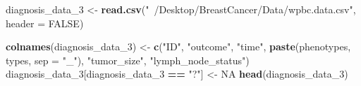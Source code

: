 \documentclass[]{article}
\newenvironment{Shaded}{\begin{snugshade}}{\end{snugshade}}
\newcommand{\KeywordTok}[1]{\textcolor[rgb]{0.13,0.29,0.53}{\textbf{#1}}}
\newcommand{\DataTypeTok}[1]{\textcolor[rgb]{0.13,0.29,0.53}{#1}}
\newcommand{\DecValTok}[1]{\textcolor[rgb]{0.00,0.00,0.81}{#1}}
\newcommand{\StringTok}[1]{\textcolor[rgb]{0.31,0.60,0.02}{#1}}
\newcommand{\OtherTok}[1]{\textcolor[rgb]{0.56,0.35,0.01}{#1}}
\newcommand{\OperatorTok}[1]{\textcolor[rgb]{0.81,0.36,0.00}{\textbf{#1}}}
\newcommand{\NormalTok}[1]{#1}
\begin{document}
\begin{Shaded}
\begin{Highlighting}[]
\NormalTok{diagnosis_data_}\DecValTok{3}\NormalTok{ <-}\StringTok{ }\KeywordTok{read.csv}\NormalTok{(}\StringTok{"~/Desktop/BreastCancer/Data/wpbc.data.csv"}\NormalTok{, }\DataTypeTok{header =} \OtherTok{FALSE}\NormalTok{)}

\KeywordTok{colnames}\NormalTok{(diagnosis_data_}\DecValTok{3}\NormalTok{) <-}\StringTok{ }\KeywordTok{c}\NormalTok{(}\StringTok{"ID"}\NormalTok{, }\StringTok{"outcome"}\NormalTok{, }\StringTok{"time"}\NormalTok{, }\KeywordTok{paste}\NormalTok{(phenotypes, types, }\DataTypeTok{sep =} \StringTok{"_"}\NormalTok{), }\StringTok{"tumor_size"}\NormalTok{, }\StringTok{"lymph_node_status"}\NormalTok{)}
\NormalTok{diagnosis_data_}\DecValTok{3}\NormalTok{[diagnosis_data_}\DecValTok{3} \OperatorTok{==}\StringTok{ "?"}\NormalTok{] <-}\StringTok{ }\OtherTok{NA}
\KeywordTok{head}\NormalTok{(diagnosis_data_}\DecValTok{3}\NormalTok{)}
\end{Highlighting}
\end{Shaded}
\end{document}
